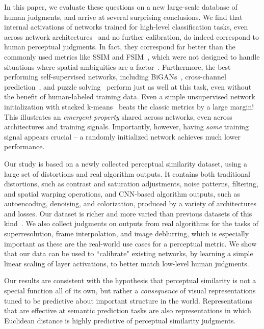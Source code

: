 In this paper, we evaluate these questions on a new large-scale database of human judgments, and arrive at several surprising conclusions. We find that internal activations of networks trained for high-level classification tasks, even across network architectures~\cite{iandola2016squeezenet,krizhevsky2012imagenet,simonyan2014very} and no further calibration, do indeed correspond to human perceptual judgments. In fact, they correspond far better than the commonly used metrics like SSIM and FSIM~\cite{wang2004image, zhang2011fsim}, which were not designed to handle situations where spatial ambiguities are a factor~\cite{sampat2009complex}. Furthermore, the best performing self-supervised networks, including BiGANs~\cite{donahue2016adversarial}, cross-channel prediction~\cite{zhang2017split}, and puzzle solving~\cite{noroozi2016unsupervised} perform just as well at this task, even without the benefit of human-labeled training data. Even a simple unsupervised network initialization with stacked k-means~\cite{krahenbuhl2015data} beats the classic metrics by a large margin! This illustrates an \textit{emergent property} shared across networks, even across architectures and training signals. Importantly, however, having \textit{some} training signal appears crucial -- a randomly initialized network achieves much lower performance.

Our study is based on a newly collected perceptual similarity dataset, using a large set of distortions and real algorithm outputs. It contains both traditional distortions, such as contrast and saturation adjustments, noise patterns, filtering, and spatial warping operations, and CNN-based algorithm outputs, such as autoencoding, denoising, and colorization, produced by a variety of architectures and losses. Our dataset is richer and more varied than previous datasets of this kind~\cite{ponomarenko2015image}. We also collect judgments on outputs from real algorithms for the tasks of superresolution, frame interpolation, and image deblurring, which is especially important as these are the real-world use cases for a perceptual metric. We show that our data can be used to ``calibrate" existing networks, by learning a simple linear scaling of layer activations, to better match low-level human judgments.

Our results are consistent with the hypothesis that perceptual similarity is not a special function all of its own, but rather a {\em consequence} of visual representations tuned to be predictive about important structure in the world. Representations that are effective at semantic prediction tasks are also representations in which Euclidean distance is highly predictive of perceptual similarity judgments.

